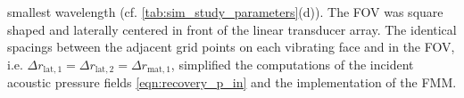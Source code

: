 smallest wavelength
(cf. \cref{tab:sim_study_parameters}(d)).
The \ac{FOV} was
square shaped and
laterally centered in front of
the linear transducer array.
The identical spacings between
the adjacent grid points on
each vibrating face and
in the \ac{FOV}, i.e.
$\Delta r_{\text{lat}, 1} = \Delta r_{\text{lat}, 2} = \Delta r_{\text{mat}, 1}$, simplified
the computations of
the incident acoustic pressure fields
\eqref{eqn:recovery_p_in} and
the implementation of
the \ac{FMM}.
